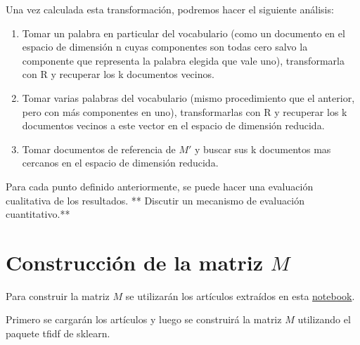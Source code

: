 \documentclass[11pt]{article}
\begin{document}
Una vez calculada esta transformación, podremos hacer el siguiente
análisis:

\begin{enumerate}
\def\labelenumi{\arabic{enumi})}
\item
  Tomar un palabra en particular del vocabulario (como un documento en
  el espacio de dimensión n cuyas componentes son todas cero salvo la
  componente que representa la palabra elegida que vale uno),
  transformarla con R y recuperar los k documentos vecinos.
\item
  Tomar varias palabras del vocabulario (mismo procedimiento que el
  anterior, pero con más componentes en uno), transformarlas con R y
  recuperar los k documentos vecinos a este vector en el espacio de
  dimensión reducida.
\item
  Tomar documentos de referencia de \(M'\) y buscar sus k documentos mas
  cercanos en el espacio de dimensión reducida.
\end{enumerate}

Para cada punto definido anteriormente, se puede hacer una evaluación
cualitativa de los resultados. ** Discutir un mecanismo de evaluación
cuantitativo.**

    \section{\texorpdfstring{Construcción de la matriz
\(M\)}{Construcción de la matriz M}}\label{construcciuxf3n-de-la-matriz-m}

Para construir la matriz \(M\) se utilizarán los artículos extraídos en
esta
\href{./Corpus\%20que\%20se\%20utilizará\%20para\%20la\%20comparación\%20de\%20métodos.ipynb}{notebook}.

Primero se cargarán los artículos y luego se construirá la matriz \(M\)
utilizando el paquete tfidf de sklearn.
\end{document}
